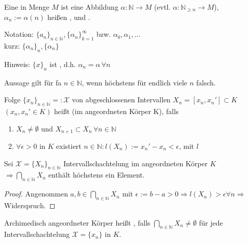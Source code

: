 \begin{*definition}[Folge]
    Eine  in Menge $M$ ist eine Abbildung $\alpha:\mathbb{N}\rightarrow M$ (evtl. $\alpha:\mathbb{N}_{\ge n}\rightarrow M$), $\alpha_n := \alpha(n)$ heißen , und .
    
	Notation: $\{a_n\}_{n\in\mathbb{N}}, \{\alpha_n\}_{k=1}^\infty$ bzw. $\alpha_0, \alpha_1, \dotsc$\\
	kurz: $\{\alpha_n\}_n, \{\alpha_n \}$
		
	Hinweis: $\{x\}_n$ ist , d.h. $\alpha_n = \alpha\,\forall n$
\end{*definition}

Aussage gilt für \gls{fa} $n\in\mathbb{N}$, wenn höchstens für endlich viele $n$ falsch.

\begin{*definition}[Intervallschachtelung]
	Folge $\{x_n\}_{n\in\mathbb{N}} =:\mathcal{X}$ von abgeschlossenen Intervallen $X_n=[x_n, x_n']\subset K$ $(x_n, x_n'\in K)$ heißt  (im angeordneten Körper K), falls
	\begin{enumerate}[label={\alph*)}]
		\item $X_n\neq \emptyset$ und $X_{n+1}\subset X_n\,\forall n\in\mathbb{N}$
		\item $\forall\epsilon > 0$ in $K$ existiert $n\in\mathbb{N}: l(X_n):= x_n' - x_n < \epsilon$, mit $l$ 
	\end{enumerate}
\end{*definition}

\begin{lemma}
	Sei $\mathcal{X} = \{X_n\}_{n\in\mathbb{N}}$ Intervallschachtelung im angeordneten Körper $K$\\
	$\Rightarrow \bigcap_{n\in\mathbb{N}} X_n$ enthält höchstens ein Element.
\end{lemma}

\begin{proof}
	Angenommen $a,b \in \bigcap_{n\in\mathbb{N}} X_n$ mit $\epsilon := b-a > 0 \Rightarrow l(X_n) > \epsilon \forall n \Rightarrow $ Widerspruch.
\end{proof}

\begin{*definition}
	Archimedisch angeordneter Körper heißt , falls $\bigcap_{n\in\mathbb{N}} X_n\neq \emptyset$ für jede Intervallschachtelung $\mathcal{X} = \{x_n\}$ in $K$.
\end{*definition}

